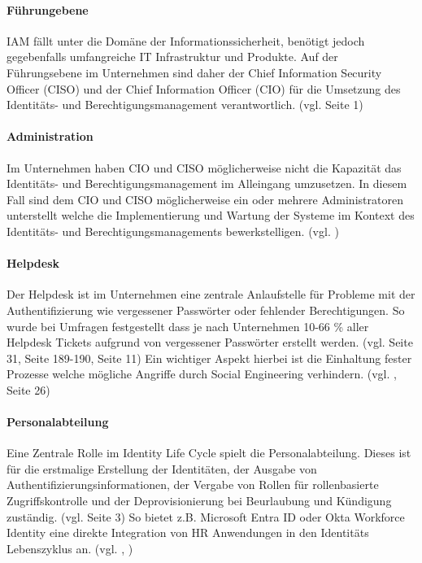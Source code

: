 \documentclass[11pt]{article}
\begin{document}
\paragraph{Führungebene}
IAM fällt unter die Domäne der Informationssicherheit, benötigt jedoch gegebenfalls umfangreiche IT Infrastruktur und Produkte. Auf der Führungsebene im Unternehmen sind daher der Chief Information Security Officer (CISO) und der Chief Information Officer (CIO) für die Umsetzung des Identitäts- und Berechtigungsmanagement verantwortlich. (vgl. \cite{mont2010economics} Seite 1)
\paragraph{Administration}
Im Unternehmen haben CIO und CISO möglicherweise nicht die Kapazität das Identitäts- und Berechtigungsmanagement im Alleingang umzusetzen. In diesem Fall sind dem CIO und CISO möglicherweise ein oder mehrere Administratoren unterstellt welche die Implementierung und Wartung der Systeme im Kontext des Identitäts- und Berechtigungsmanagements bewerkstelligen. (vgl. \cite{microsoft2024iamadmin})
\paragraph{Helpdesk}
Der Helpdesk ist im Unternehmen eine zentrale Anlaufstelle für Probleme mit der Authentifizierung wie vergessener Passwörter oder fehlender Berechtigungen. So wurde bei Umfragen festgestellt dass je nach Unternehmen 10-66 \% aller Helpdesk Tickets aufgrund von vergessener Passwörter erstellt werden. (vgl. \cite{ylen2004centralized} Seite 31, \cite{tsolkas2017} Seite 189-190, \cite{hummer2016adaptive} Seite 11) Ein wichtiger Aspekt hierbei ist die Einhaltung fester Prozesse welche mögliche Angriffe durch Social Engineering verhindern. (vgl. \cite{wood2005implementing}, \cite{ylen2004centralized} Seite 26)
\paragraph{Personalabteilung}
Eine Zentrale Rolle im Identity Life Cycle spielt die Personalabteilung. Dieses ist für die erstmalige Erstellung der Identitäten, der Ausgabe von Authentifizierungsinformationen, der Vergabe von Rollen für rollenbasierte Zugriffskontrolle und der Deprovisionierung bei Beurlaubung und Kündigung zuständig. (vgl. \cite{mohammed2017systematic} Seite 3) So bietet z.B. Microsoft Entra ID oder Okta Workforce Identity eine direkte Integration von HR Anwendungen in den Identitäts Lebenszyklus an. (vgl. \cite{oktahr}, \cite{Billmath2024})
\end{document}
